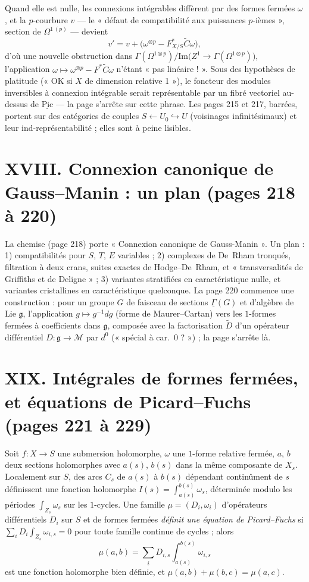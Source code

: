 \documentclass[11pt,a4paper]{article}
\begin{document}
Quand elle est nulle, les connexions intégrables diffèrent par des formes
fermées $\omega$, et la $p$-courbure $v$ — le « défaut de compatibilité aux
puissances $p$-ièmes », section de $\Omega^{1\,(p)}$ — devient
\[
  v' = v + \bigl(\omega^{\otimes p} - F^*_{X/S}\widetilde C\omega\bigr) ,
\]
d'où une nouvelle obstruction dans $\Gamma(\Omega^{1\otimes p})/\mathrm{Im}
\bigl(Z^1 \to \Gamma(\Omega^{1\otimes p})\bigr)$, l'application $\omega \mapsto
\omega^{\otimes p} - F^*\widetilde C\omega$ n'étant « pas linéaire ! ». Sous des
hypothèses de platitude (« OK si $X$ de dimension relative 1 »), le foncteur
des modules inversibles à connexion intégrable serait représentable par un
fibré vectoriel au-dessus de $\underline{\mathrm{Pic}}$ — la page s'arrête sur
cette phrase. Les pages 215 et 217, barrées, portent sur des catégories de
couples $S \leftarrow U_0 \hookrightarrow U$ (voisinages infinitésimaux) et leur
ind-représentabilité ; elles sont à peine lisibles.

\section*{XVIII. Connexion canonique de Gauss--Manin : un plan (pages 218 à 220)}

La chemise (page 218) porte « Connexion canonique de Gauss-Manin ». Un plan :
1) compatibilités pour $S$, $T$, $E$ variables ; 2) complexes de De~Rham
tronqués, filtration à deux crans, suites exactes de Hodge--De~Rham, et
« transversalités de Griffiths et de Deligne » ; 3) variantes stratifiées en
caractéristique nulle, et variantes cristallines en caractéristique
quelconque. La page 220 commence une construction : pour un groupe $G$ de
faisceau de sections $\underline\Gamma(G)$ et d'algèbre de Lie $\mathfrak{g}$,
l'application $g \mapsto g^{-1}dg$ (forme de Maurer--Cartan) vers les
$1$-formes fermées à coefficients dans $\mathfrak{g}$, composée avec la
factorisation $\tilde D$ d'un opérateur différentiel $D : \mathfrak{g} \to
\mathcal{M}$ par $d^0$ (« spécial à car.~0 ? ») ; la page s'arrête là.

\section*{XIX. Intégrales de formes fermées, et équations de Picard--Fuchs (pages 221 à 229)}

Soit $f : X \to S$ une submersion holomorphe, $\omega$ une $1$-forme
relative fermée, $a$, $b$ deux sections holomorphes avec $a(s)$, $b(s)$ dans
la même composante de $X_s$. Localement sur $S$, des arcs $C_s$ de $a(s)$ à
$b(s)$ dépendant continûment de $s$ définissent une fonction holomorphe
$I(s) = \int_{a(s)}^{b(s)} \omega_s$, déterminée modulo les périodes
$\int_{Z_s}\omega_s$ sur les $1$-cycles. Une famille $\mu = (D_i, \omega_i)$
d'opérateurs différentiels $D_i$ sur $S$ et de formes fermées \emph{définit
une équation de Picard--Fuchs} si $\sum_i D_i\int_{Z_s}\omega_{i,s} = 0$ pour
toute famille continue de cycles ; alors
\[
  \mu(a,b) = \sum_i D_{i,s} \int_{a(s)}^{b(s)} \omega_{i,s}
\]
est une fonction holomorphe bien définie, et $\mu(a,b) + \mu(b,c) = \mu(a,c)$.
\end{document}
